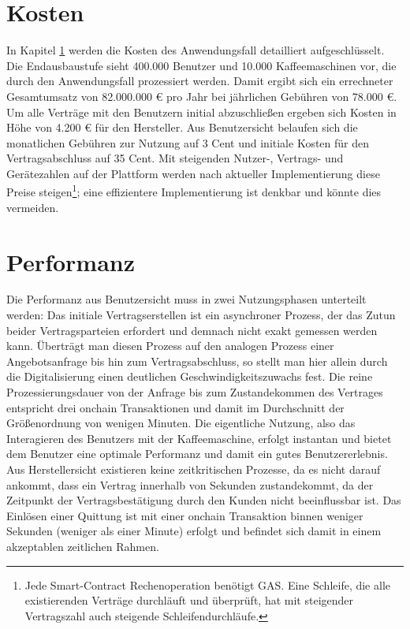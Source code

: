 \section{Kosten}
\label{sec:results:costs}
In Kapitel \ref{sec:results:costs} werden die Kosten des Anwendungsfall detailliert aufgeschlüsselt. Die Endausbaustufe sieht 400.000 Benutzer und 10.000 Kaffeemaschinen vor, die durch den Anwendungsfall prozessiert werden. Damit ergibt sich ein errechneter Gesamtumsatz von 82.000.000 € pro Jahr bei jährlichen Gebühren von 78.000 €. Um alle Verträge mit den Benutzern initial abzuschließen ergeben sich Kosten in Höhe von 4.200 € für den Hersteller. Aus Benutzersicht belaufen sich die monatlichen Gebühren zur Nutzung auf 3 Cent und initiale Kosten für den Vertragsabschluss auf 35 Cent. Mit steigenden Nutzer-, Vertrags- und Gerätezahlen auf der Plattform werden nach aktueller Implementierung diese Preise steigen\footnote{Jede Smart-Contract Rechenoperation benötigt GAS. Eine Schleife, die alle existierenden Verträge durchläuft und überprüft, hat mit steigender Vertragszahl auch steigende Schleifendurchläufe.}; eine effizientere Implementierung ist denkbar und könnte dies vermeiden.

\section{Performanz}
\label{sec:results:performance}
Die Performanz aus Benutzersicht muss in zwei Nutzungsphasen unterteilt werden: Das initiale Vertragserstellen ist ein asynchroner Prozess, der das Zutun beider Vertragsparteien erfordert und demnach nicht exakt gemessen werden kann. Überträgt man diesen Prozess auf den analogen Prozess einer Angebotsanfrage bis hin zum Vertragsabschluss, so stellt man hier allein durch die Digitalisierung einen deutlichen Geschwindigkeitszuwachs fest. Die reine Prozessierungsdauer von der Anfrage bis zum Zustandekommen des Vertrages entspricht drei onchain Transaktionen und damit im Durchschnitt der Größenordnung von wenigen Minuten. Die eigentliche Nutzung, also das Interagieren des Benutzers mit der Kaffeemaschine, erfolgt instantan und bietet dem Benutzer eine optimale Performanz und damit ein gutes Benutzererlebnis.\\
Aus Herstellersicht existieren keine zeitkritischen Prozesse, da es nicht darauf ankommt, dass ein Vertrag innerhalb von Sekunden zustandekommt, da der Zeitpunkt der Vertragsbestätigung durch den Kunden nicht beeinflussbar ist. Das Einlösen einer Quittung ist mit einer onchain Transaktion binnen weniger Sekunden (weniger als einer Minute) erfolgt und befindet sich damit in einem akzeptablen zeitlichen Rahmen.

